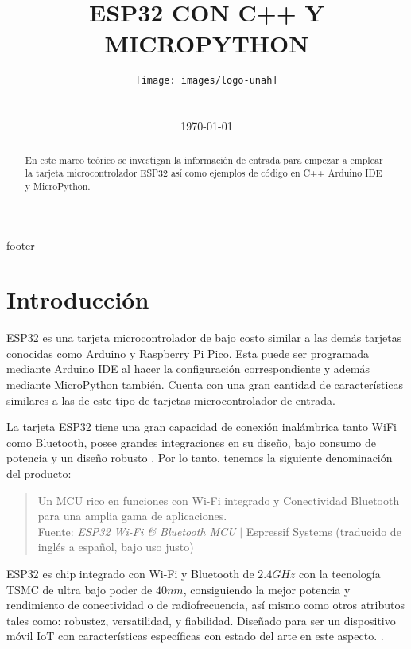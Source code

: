 \documentclass[conference]{IEEEtran}
\title{ESP32 CON C++ Y MICROPYTHON}
\author{
    \texttt{[image: images/logo-unah]}\\[8ex]
    \IEEEauthorblockN{Tobias Briones}
    \IEEEauthorblockN{tobias.briones@unah.hn}
    \IEEEauthorblockA{\textit{Universidad Nacional Autónoma de Honduras} \\
    \textit{Ingeniería de Sistemas} \\
    \textit{I PAC 2022} \\
    \textit{IS911-MICROPROCESADORES}} \\\vspace*{20pt} \normalsize  \\
    \today
}
\begin{document}
    \maketitle

    \begin{abstract}
        En este marco teórico se investigan la información de entrada para
        empezar a emplear la tarjeta microcontrolador ESP32 así como ejemplos
        de código en C++ Arduino IDE y MicroPython.
    \end{abstract}

    \tableofcontents

    {footer}

    \section{Introducción}\label{sec:introduction}

    ESP32 es una tarjeta microcontrolador de bajo costo
    \cite{wikipedia-esp32-2022} similar a las demás tarjetas conocidas como
    Arduino y Raspberry Pi Pico. Esta puede ser programada mediante Arduino
    IDE al hacer la configuración correspondiente y además mediante
    MicroPython también. Cuenta con una gran cantidad de características
    similares a las de este tipo de tarjetas microcontrolador de entrada.

    \bigbreak

    La tarjeta ESP32 tiene una gran capacidad de conexión inalámbrica tanto
    WiFi como Bluetooth, posee grandes integraciones en su diseño, bajo
    consumo de potencia y un diseño robusto
    \cite{espressif-systems-shanghai-co-ltd-2022A}. Por lo tanto, tenemos la
    siguiente denominación del producto:

    \bigbreak

    \begin{quote}
        Un MCU rico en funciones con Wi-Fi integrado y Conectividad Bluetooth
        para una amplia gama de aplicaciones.\\ \footnotesize
        Fuente: \textit{ESP32 Wi-Fi \& Bluetooth MCU} $\mid$ Espressif
        Systems \cite{espressif-systems-shanghai-co-ltd-2022A} (traducido de
        inglés a español, bajo uso justo)
    \end{quote}

    \bigbreak

    ESP32 es chip integrado con Wi-Fi y Bluetooth de $2.4GHz$ con la
    tecnología TSMC de ultra bajo poder de $40nm$, consiguiendo la mejor
    potencia y rendimiento de conectividad o de radiofrecuencia, así mismo
    como otros atributos tales como: robustez, versatilidad, y fiabilidad.
    Diseñado para ser un dispositivo móvil IoT con características
    específicas con estado del arte en este aspecto.
    \cite{espressif-systems-shanghai-co-ltd-2022B}.
\end{document}
